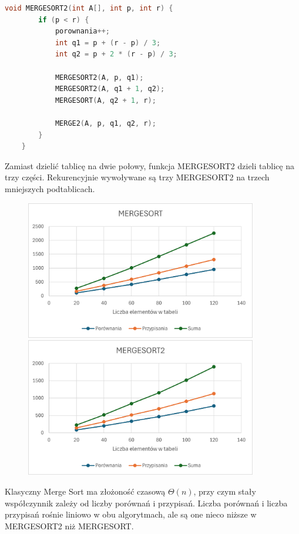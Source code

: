 \documentclass{article}
\begin{document}
	\begin{lstlisting}[language=C++, tabsize=3]
	void MERGESORT2(int A[], int p, int r) {
		if (p < r) {
			porownania++;
			int q1 = p + (r - p) / 3;
			int q2 = p + 2 * (r - p) / 3;
			
			MERGESORT2(A, p, q1);
			MERGESORT2(A, q1 + 1, q2);
			MERGESORT(A, q2 + 1, r);
			
			MERGE2(A, p, q1, q2, r);
		}
	}
	\end{lstlisting}
	Zamiast dzielić tablicę na dwie połowy, funkcja MERGESORT2 dzieli tablicę na trzy części. Rekurencyjnie wywoływane są trzy MERGESORT2 na trzech mniejszych podtablicach.
	
	\begin{figure}[H]
		\centering
		\includegraphics[width=0.9\textwidth]{MER1.png}
		\includegraphics[width=0.9\textwidth]{MER2.png}
	\end{figure}
	
	
	Klasyczny Merge Sort ma złożoność czasową \( \Theta(n) \), przy czym stały współczynnik zależy od liczby porównań i przypisań. Liczba porównań i liczba przypisań rośnie liniowo w obu algorytmach, ale są one nieco niższe w MERGESORT2 niż MERGESORT.
	
\end{document}
